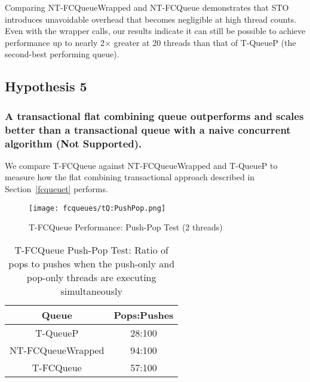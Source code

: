 Comparing NT-FCQueueWrapped and NT-FCQueue demonstrates that STO introduces unavoidable overhead that becomes negligible at high thread counts. Even with the wrapper calls, our results indicate it can still be possible to achieve performance up to nearly 2$\times$ greater at 20 threads than that of T-QueueP (the second-best performing queue).

\vspace{12pt}
\noindent{}

\subsection{Hypothesis 5}
\subsubsection{A transactional flat combining queue outperforms and scales better than a transactional queue with a naive concurrent algorithm (Not Supported).}
\label{eval:hypo5}

We compare T-FCQueue against NT-FCQueueWrapped and T-QueueP to measure how the flat combining transactional approach described in Section~\ref{fcqueuet} performs.

\begin{figure}[t!]
    \centering
	\begin{minipage}{0.9\textwidth}
        {\texttt{[image: fcqueues/tQ:PushPop.png]}}
	\end{minipage}
        \caption{T-FCQueue Performance: Push-Pop Test (2 threads)}
        \label{fig:tqs_pp}
\end{figure}

\begin{table}[t!]
        \centering
    \begin{tabular}{|cc|}
        \hline
        Queue & Pops:Pushes\\
        \hline
            T-QueueP & 28:100\\
            NT-FCQueueWrapped & 94:100\\
            T-FCQueue & 57:100\\
        \hline
    \end{tabular}
    \caption{T-FCQueue Push-Pop Test: Ratio of pops to pushes when the push-only and pop-only threads are executing simultaneously}
    \label{tab:tfc_pop_push_ratio}
\end{table}

